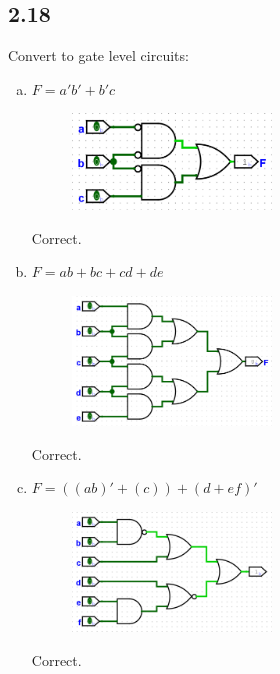 \documentclass{article}
\begin{document}
\subsection*{2.18}
Convert to gate level circuits:
\begin{enumerate}[(a)]
    \item $F = a'b' + b'c$
    \begin{figure}[h]
        \centering
        \includegraphics[width=0.5\textwidth]{./images/2_18_a.png}
    \end{figure}
    \textcolor{mygreen}{Correct.}
    \item $F = ab + bc + cd + de$
    \begin{figure}[h]
        \centering
        \includegraphics[width=0.5\textwidth]{./images/2_18_b.png}
    \end{figure}
    \textcolor{mygreen}{Correct.}
    \newpage
    \item $F = ((ab)' + (c)) + (d + ef)'$
    \begin{figure}[h]
        \centering
        \includegraphics[width=0.5\textwidth]{./images/2_18_c.png}
    \end{figure}
    \textcolor{mygreen}{Correct.}
\end{enumerate}
\end{document}
